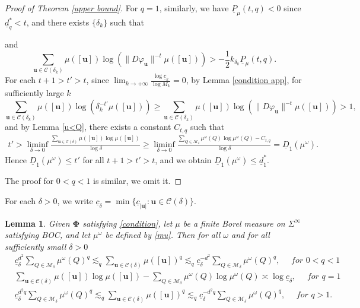 \documentclass[12pt]{amsart}
\theoremstyle{plain}
\newtheorem{lem}[thm]{Lemma}
\theoremstyle{definition}
\theoremstyle{remark}
\newcommand{\bu}{\mathbf{u}}
\begin{document}
\begin{proof}[Proof of Theorem \ref{upper bound}]
\fi


For $q=1$, similarly, we have  $\underline P_\mu(t, q)<0$  since $\underline{d}_q^*<t$,  and   there exists $\{\delta_k\}$ such that

and
$$
\sum_{\mathbf{u}\in\mathcal{C}(\delta_k)}\mu([\bu])\log(\|D\varphi_\mathbf{u}\|^{-t}\mu([\bu]))>-\frac{1}{2}k_{\delta_k}  \underline P_\mu(t, q).
$$
 For each  $t+1>t'>t$, since $\lim_{k\to +\infty} \frac{\log\underline c_k}{\log M_k}=0$, by Lemma \ref{condition app},  for sufficiently large $k$ 
$$
\sum_{\mathbf{u}\in\mathcal{C}(\delta_k)}\mu([\bu])\log(\delta_k^{-t'}\mu([\bu]))\ge\sum_{\mathbf{u}\in\mathcal{C}(\delta_k)}\mu([\bu])\log(\|D\varphi_\mathbf{u}\|^{-t}\mu([\bu]))>1,
$$
and by Lemma \ref{u<Q}, there exists a constant $C_{t,q}$ such that
\begin{eqnarray*}
t'>\liminf_{\delta\to 0}\frac{ \sum_{\mathbf{u}\in\mathcal{C}(\delta)}\mu([\bu])\log\mu([\bu])}{\log \delta} \ge\liminf_{\delta\to 0}\frac{ \sum_{Q\in{\mathcal{M}_\delta}}\mu^\omega(Q)\log\mu^\omega(Q)-C_{t,q}}{\log \delta}  =\underline{D}_1(\mu^\omega).
\end{eqnarray*}
Hence  $\underline{D}_1(\mu^\omega)\le t'$ for all $t+1>t'>t$, and we obtain  $\underline{D}_1(\mu^\omega)\le \underline{d}_1^*.$

The proof for $0<q<1$ is similar, we omit it.
\end{proof}



For each $\delta>0$, we write $\underline{c}_\delta=\min\{\underline c_{|\bu|}:\mathbf{u}\in \mathcal{C}(\delta)\}$.


\begin{lem}\label{u=Q}
Given  $\boldsymbol{\Phi}$ satisfying \eqref{condition}, let $\mu$ be a finite Borel measure on $\Sigma^\infty$ satisfying BOC, and let $\mu^\omega$ be defined by \eqref{mu}. Then for all $\omega$ and for all sufficiently small $\delta>0$
\begin{equation*}\begin{split}
&\underline{c}_\delta^{d^2}\sum_{Q\in{\mathcal{M}_\delta}}\mu^\omega(Q)^q\lesssim_q\sum_{\mathbf{u}\in\mathcal{C}(\delta)}\mu([\bu])^q\lesssim_q \underline{c}_\delta^{-d^2}\sum_{Q\in{\mathcal{M}_\delta}}\mu^\omega(Q)^q, \quad \textit{ for $0<q<1$} \\ 
&\sum_{\mathbf{u}\in\mathcal{C}(\delta)}\mu([\bu])\log \mu([\bu])-\sum_{Q\in{\mathcal{M}_\delta}}\mu^\omega(Q)\log \mu^\omega(Q)\asymp\log \underline{c}_\delta, \quad \textit{ for $q=1$} \\ 
&\underline{c}_\delta^{d^2q}\sum_{Q\in{\mathcal{M}_\delta}}\mu^\omega(Q)^q\lesssim_q\sum_{\mathbf{u}\in\mathcal{C}(\delta)}\mu([\bu])^q\lesssim_q \underline{c}_\delta^{-d^2q}\sum_{Q\in{\mathcal{M}_\delta}}\mu^\omega(Q)^q,  \quad \textit{ for $q>1$}. 
\end{split}
\end{equation*}
\end{lem}
\end{document}

